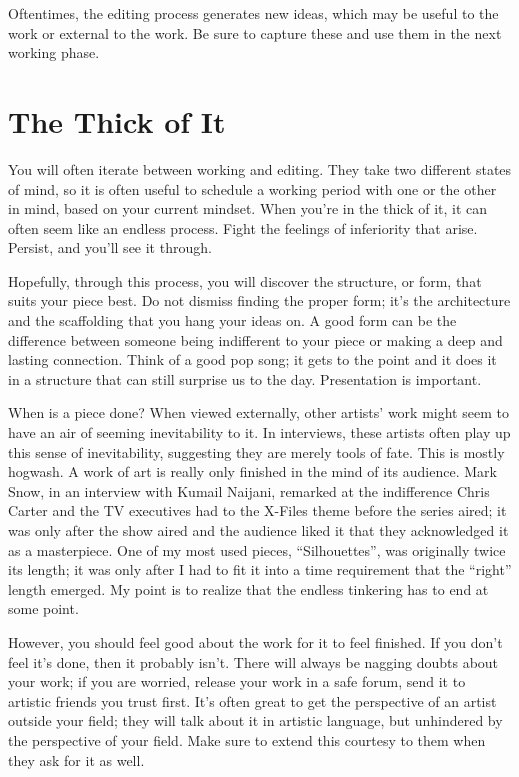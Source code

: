 \documentclass[
]{book}
\begin{document}
Oftentimes, the editing process generates new ideas, which may be useful to the work or external to the work. Be sure to capture these and use them in the next working phase.

\hypertarget{the-thick-of-it}{%
\section{The Thick of It}\label{the-thick-of-it}}

You will often iterate between working and editing. They take two different states of mind, so it is often useful to schedule a working period with one or the other in mind, based on your current mindset. When you're in the thick of it, it can often seem like an endless process. Fight the feelings of inferiority that arise. Persist, and you'll see it through.

Hopefully, through this process, you will discover the structure, or form, that suits your piece best. Do not dismiss finding the proper form; it's the architecture and the scaffolding that you hang your ideas on. A good form can be the difference between someone being indifferent to your piece or making a deep and lasting connection. Think of a good pop song; it gets to the point and it does it in a structure that can still surprise us to the day. Presentation is important.

When is a piece done? When viewed externally, other artists' work might seem to have an air of seeming inevitability to it. In interviews, these artists often play up this sense of inevitability, suggesting they are merely tools of fate. This is mostly hogwash. A work of art is really only finished in the mind of its audience. Mark Snow, in an interview with Kumail Naijani, remarked at the indifference Chris Carter and the TV executives had to the X-Files theme before the series aired; it was only after the show aired and the audience liked it that they acknowledged it as a masterpiece. One of my most used pieces, ``Silhouettes'', was originally twice its length; it was only after I had to fit it into a time requirement that the ``right'' length emerged. My point is to realize that the endless tinkering has to end at some point.

However, you should feel good about the work for it to feel finished. If you don't feel it's done, then it probably isn't. There will always be nagging doubts about your work; if you are worried, release your work in a safe forum, send it to artistic friends you trust first. It's often great to get the perspective of an artist outside your field; they will talk about it in artistic language, but unhindered by the perspective of your field. Make sure to extend this courtesy to them when they ask for it as well.
\end{document}
